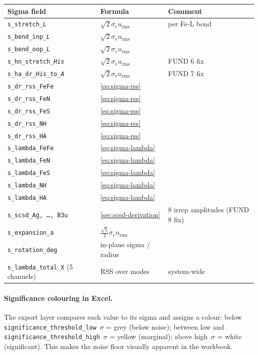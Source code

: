 \documentclass[10pt,a4paper,twoside]{article}
\newcommand{\urms}{u_{\mathrm{rms}}}
\newcommand{\cfgkey}[1]{\texttt{#1}}
\begin{document}
\begin{longtable}{p{} p{} p{}}
\toprule
\textbf{Sigma field} & \textbf{Formula} & \textbf{Comment} \\
\midrule
\texttt{s\_stretch\_\textit{L}}        & $\sqrt{2}\sigma_e\urms$ & per Fe-L bond \\
\texttt{s\_bend\_inp\_\textit{L}}      & $\sqrt{2}\sigma_e\urms$ & \\
\texttt{s\_bend\_oop\_\textit{L}}      & $\sqrt{2}\sigma_e\urms$ & \\
\texttt{s\_hn\_stretch\_\textit{His}}  & $\sqrt{2}\sigma_e\urms$ & FUND 6 fix \\
\texttt{s\_ha\_dr\_\textit{His}\_to\_\textit{A}} & $\sqrt{2}\sigma_e\urms$ & FUND 7 fix \\
\texttt{s\_dr\_rss\_FeFe}              & \cref{eq:sigma-rss} & \\
\texttt{s\_dr\_rss\_FeN}               & \cref{eq:sigma-rss} & \\
\texttt{s\_dr\_rss\_FeS}               & \cref{eq:sigma-rss} & \\
\texttt{s\_dr\_rss\_NH}                & \cref{eq:sigma-rss} & \\
\texttt{s\_dr\_rss\_HA}                & \cref{eq:sigma-rss} & \\
\texttt{s\_lambda\_FeFe}               & \cref{eq:sigma-lambda} & \\
\texttt{s\_lambda\_FeN}                & \cref{eq:sigma-lambda} & \\
\texttt{s\_lambda\_FeS}                & \cref{eq:sigma-lambda} & \\
\texttt{s\_lambda\_NH}                 & \cref{eq:sigma-lambda} & \\
\texttt{s\_lambda\_HA}                 & \cref{eq:sigma-lambda} & \\
\texttt{s\_scsd\_Ag, \ldots, B3u}      & \cref{sec:scsd-derivation} & 8 irrep amplitudes (FUND 8 fix) \\
\texttt{s\_expansion\_a}               & $\tfrac{\sqrt{5}}{2}\sigma_e\urms$ & \\
\texttt{s\_rotation\_deg}              & in-plane sigma / radius & \\
\texttt{s\_lambda\_total\_X} (5 channels) & RSS over modes & system-wide \\
\bottomrule
\end{longtable}

\paragraph{Significance colouring in Excel.}
The export layer compares each value to its sigma and assigns a
colour: below \cfgkey{significance\_threshold\_low}~$\sigma$ = grey
(below noise); between low and \cfgkey{significance\_threshold\_high}~$\sigma$
= yellow (marginal); above high~$\sigma$ = white (significant).
This makes the noise floor visually apparent in the workbook.
\end{document}
